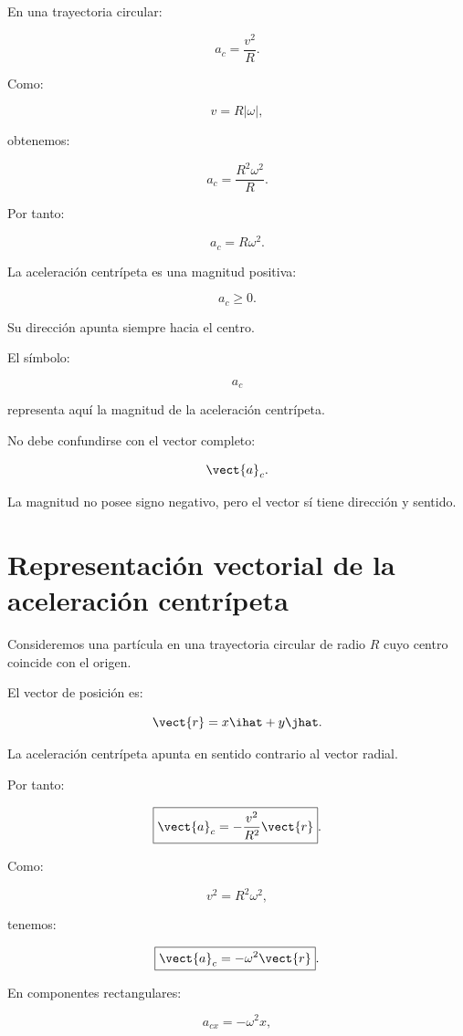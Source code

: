 En una trayectoria circular:

\[
\boxed{
a_c=\frac{v^2}{R}
}.
\]

Como:

\[
v=R|\omega|,
\]

obtenemos:

\[
a_c
=
\frac{R^2\omega^2}{R}.
\]

Por tanto:

\[
\boxed{
a_c=R\omega^2
}.
\]

La aceleración centrípeta es una magnitud positiva:

\[
a_c\geq0.
\]

Su dirección apunta siempre hacia el centro.

\begin{advertencia}

El símbolo:

\[
a_c
\]

representa aquí la magnitud de la aceleración centrípeta.

No debe confundirse con el vector completo:

\[
\vect{a}_c.
\]

La magnitud no posee signo negativo, pero el vector sí tiene dirección y
sentido.

\end{advertencia}


\section{Representación vectorial de la aceleración centrípeta}

Consideremos una partícula en una trayectoria circular de radio \(R\) cuyo
centro coincide con el origen.

El vector de posición es:

\[
\vect{r}
=
x\ihat+y\jhat.
\]

La aceleración centrípeta apunta en sentido contrario al vector radial.

Por tanto:

\[
\boxed{
\vect{a}_c
=
-\frac{v^2}{R^2}\vect{r}
}.
\]

Como:

\[
v^2=R^2\omega^2,
\]

tenemos:

\[
\boxed{
\vect{a}_c=-\omega^2\vect{r}
}.
\]

En componentes rectangulares:

\[
\boxed{
a_{cx}=-\omega^2x
},
\]

